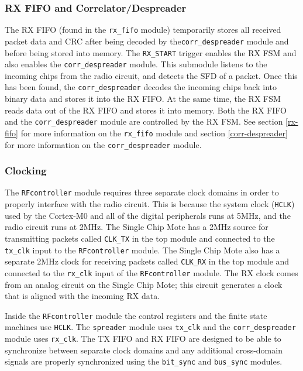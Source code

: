 \subsubsection{RX FIFO and Correlator/Despreader}
The RX FIFO (found in the \texttt{rx\_fifo} module) temporarily stores all received packet data and CRC after being decoded by the\texttt{corr\_despreader} module and before being stored into memory. The \texttt{RX\_START} trigger enables the RX FSM and also enables the \texttt{corr\_despreader} module. This submodule listens to the incoming chips from the radio circuit, and detects the SFD of a packet. Once this has been found, the \texttt{corr\_despreader} decodes the incoming chips back into binary data and stores it into the RX FIFO. At the same time, the RX FSM reads data out of the RX FIFO and stores it into memory. Both the RX FIFO and the \texttt{corr\_despreader} module are controlled by the RX FSM. See section \ref{rx-fifo} for more information on the \texttt{rx\_fifo} module and section \ref{corr-despreader} for more information on the \texttt{corr\_despreader} module.

\subsubsection{Clocking}
The \texttt{RFcontroller} module requires three separate clock domains in order to properly interface with the radio circuit. This is because the system clock (\texttt{HCLK}) used by the Cortex-M0 and all of the digital peripherals runs at 5MHz, and the radio circuit runs at 2MHz. The Single Chip Mote has a 2MHz source for transmitting packets called \texttt{CLK\_TX} in the top module and connected to the \texttt{tx\_clk} input to the \texttt{RFcontroller} module. The Single Chip Mote also has a separate 2MHz clock for receiving packets called \texttt{CLK\_RX} in the top module and connected to the \texttt{rx\_clk} input of the \texttt{RFcontroller} module. The RX clock comes from an analog circuit on the Single Chip Mote; this circuit generates a clock that is aligned with the incoming RX data.

Inside the \texttt{RFcontroller} module the control registers and the finite state machines use \texttt{HCLK}. The \texttt{spreader} module uses \texttt{tx\_clk} and the \texttt{corr\_despreader} module uses \texttt{rx\_clk}. The TX FIFO and RX FIFO are designed to be able to synchronize between separate clock domains and any additional cross-domain signals are properly synchronized using the \texttt{bit\_sync} and \texttt{bus\_sync} modules.

